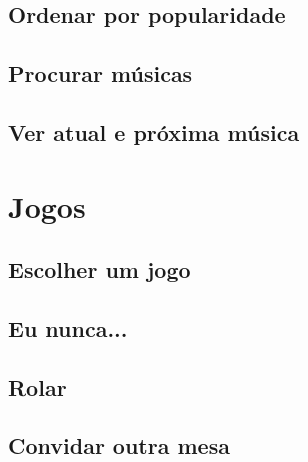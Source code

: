 \documentclass{article}
\begin{document}
\subsection{Ordenar por popularidade}
\subsection{Procurar músicas}
\subsection{Ver atual e próxima música}
\section{Jogos}
\subsection{Escolher um jogo}
\subsection{Eu nunca...}
\subsection{Rolar}
\subsection{Convidar outra mesa}
\end{document}
